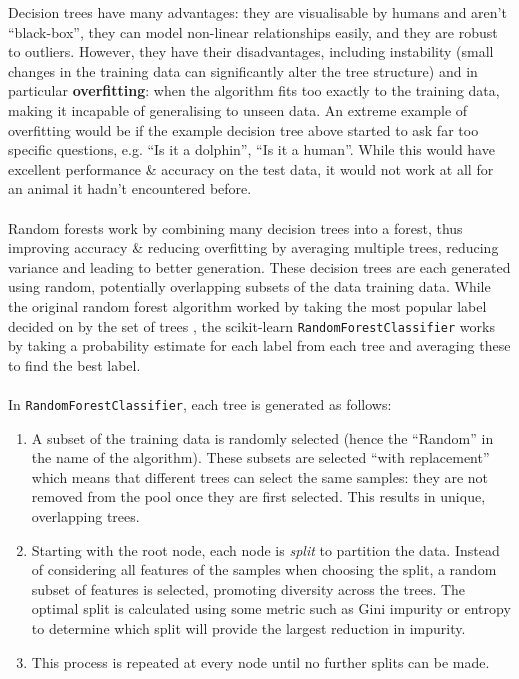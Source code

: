 \documentclass[a4paper, 10pt]{article}
\begin{document}
Decision trees have many advantages: they are visualisable by humans and aren't ``black-box'', they can model non-linear relationships easily, and they are robust to outliers.
However, they have their disadvantages, including instability (small changes in the training data can significantly alter the tree structure) and in particular \textbf{overfitting}: when the algorithm fits too exactly to the training data, making it incapable of generalising to unseen data.
An extreme example of overfitting would be if the example decision tree above started to ask far too specific questions, e.g. ``Is it a dolphin'', ``Is it a human''. 
While this would have excellent performance \& accuracy on the test data, it would not work at all for an animal it hadn't encountered before.
\\\\
Random forests work by combining many decision trees into a forest, thus improving accuracy \& reducing overfitting by averaging multiple trees, reducing variance and leading to better generation.
These decision trees are each generated using random, potentially overlapping subsets of the data training data.
While the original random forest algorithm worked by taking the most popular label decided on by the set of trees \supercite{breiman}, the scikit-learn \texttt{RandomForestClassifier} works by taking a probability estimate for each label from each tree and averaging these to find the best label\supercite{scikit_ensembles}.
\\\\
In \texttt{RandomForestClassifier}, each tree is generated as follows:
\begin{enumerate}
    \item   A subset of the training data is randomly selected (hence the ``Random'' in the name of the algorithm).
            These subsets are selected ``with replacement'' which means that different trees can select the same samples: they are not removed from the pool once they are first selected.
            This results in unique, overlapping trees.
    \item   Starting with the root node, each node is \textit{split} to partition the data.
            Instead of considering all features of the samples when choosing the split, a random subset of features is selected, promoting diversity across the trees.
            The optimal split is calculated using some metric such as Gini impurity or entropy to determine which split will provide the largest reduction in impurity.
    \item   This process is repeated at every node until no further splits can be made.
\end{enumerate}
\end{document}
